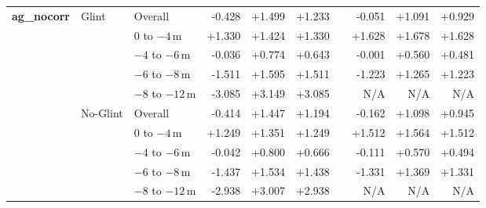 \begin{table}[htbp]
{\begin{tabular}{lll rrr c rrr}
\multirow{10}{*}{\textbf{ag\_nocorr}} & \multirow{5}{*}{Glint} & Overall              &  -0.428 & +1.499 & +1.233 & &  -0.051 & +1.091 & +0.929 \\
                           &                      & $0$ to $-4$\,m       &  +1.330 & +1.424 & +1.330 & &  +1.628 & +1.678 & +1.628 \\
                           &                      & $-4$ to $-6$\,m      &  -0.036 & +0.774 & +0.643 & &  -0.001 & +0.560 & +0.481 \\
                           &                      & $-6$ to $-8$\,m      &  -1.511 & +1.595 & +1.511 & &  -1.223 & +1.265 & +1.223 \\
                           &                      & $-8$ to $-12$\,m     &  -3.085 & +3.149 & +3.085 & &     N/A &   N/A &   N/A \\
\cmidrule(lr){2-10}
                           & \multirow{5}{*}{No-Glint} & Overall              &  -0.414 & +1.447 & +1.194 & &  -0.162 & +1.098 & +0.945 \\
                           &                      & $0$ to $-4$\,m       &  +1.249 & +1.351 & +1.249 & &  +1.512 & +1.564 & +1.512 \\
                           &                      & $-4$ to $-6$\,m      &  -0.042 & +0.800 & +0.666 & &  -0.111 & +0.570 & +0.494 \\
                           &                      & $-6$ to $-8$\,m      &  -1.437 & +1.534 & +1.438 & &  -1.331 & +1.369 & +1.331 \\
                           &                      & $-8$ to $-12$\,m     &  -2.938 & +3.007 & +2.938 & &     N/A &   N/A &   N/A \\
\midrule


\end{tabular}}
\end{table}

